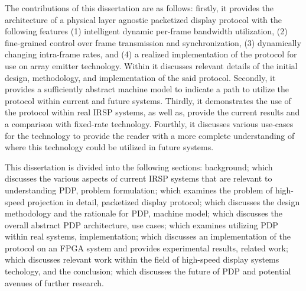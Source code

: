 The contributions of this dissertation are as follows: firstly, it provides the architecture of a physical layer agnostic packetized display protocol with the following features (1) intelligent dynamic per-frame bandwidth utilization, (2) fine-grained control over frame transmission and synchronization, (3) dynamically changing intra-frame rates, and (4) a realized implementation of the protocol for use on array emitter technology. Within it discusses relevant details of the initial design, methodology, and implementation of the said protocol. Secondly, it provides a sufficiently abstract machine model to indicate a path to utilize the protocol within current and future systems. Thirdly, it demonstrates the use of the protocol within real IRSP systems, as well as, provide the current results and a comparison with fixed-rate technology. Fourthly, it discusses various use-cases for the technology to provide the reader with a more complete understanding of where this technology could be utilized in future systems.

This dissertation is divided into the following sections: background; which discusses the various aspects of current IRSP systems that are relevant to understanding PDP, problem formulation; which examines the problem of high-speed projection in detail, packetized display protocol; which discusses the design methodology and the rationale for PDP, machine model; which discusses the overall abstract PDP architecture, use cases; which examines utilizing PDP within real systems, implementation; which discusses an implementation of the protocol on an FPGA system and provides experimental results, related work; which discusses relevant work within the field of high-speed display systems techology, and the conclusion; which discusses the future of PDP and potential avenues of further research.
